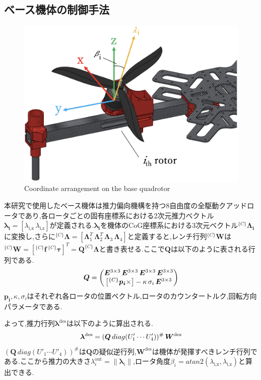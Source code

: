 \documentclass{jarticle}
\begin{document}
\subsection{ベース機体の制御手法}
\vspace{-4mm}
\begin{figure}[H]
  \centering
  \includegraphics[width=0.6\columnwidth]{figs/coordinate.eps}
  \caption{Coordinate arrangement on the base quadrotor}
  \label{fig:coordinate}
  \vspace{-2mm}
\end{figure}
本研究で使用したベース機体は推力偏向機構を持つ8自由度の全駆動クアッドロータであり,各ロータごとの固有座標系における2次元推力ベクトル$\bm{\lambda_i} = [\lambda_\text{i,x} \, \lambda_\text{i,z}]$が定義される\cite{j-sugihara}.$\bm{\lambda_i}$を機体のCoG座標系における3次元ベクトル$^{\{C\}}\bm{\Lambda_i}$に変換し,さらに$^{\{C\}}\bm{\Lambda} = [\bm{\Lambda}_1^T \, \bm{\Lambda}_2^T \, \bm{\Lambda}_3 \, \bm{\Lambda}_4]$と定義すると,レンチ行列$^{\{C\}}\bm{W}$は$^{\{C\}}\bm{W} = [^{\{C\}}\bm{f} \, ^{\{C\}}\bm{\tau}]^T = \bm{Q} ^{\{C\}}\bm{\Lambda}$と書き表せる.ここで$\bm{Q}$は以下のように表される行列である.
\vspace{-2mm}
\begin{equation}
  \bm{Q} =
  \begin{pmatrix}
    \bm{E}^{3 \times 3} \, \bm{E}^{3 \times 3} \, \bm{E}^{3 \times 3} \, \bm{E}^{3 \times 3} \\
    \left[ ^{\{C\}}\bm{p_i} \times \right] - \kappa \, \sigma_i \, \bm{E}^{3 \times 3}
  \end{pmatrix}
  \vspace{-2mm}
\end{equation}
$\bm{p_i},\kappa,\sigma_i$はそれぞれ各ロータの位置ベクトル,ロータのカウンタートルク,回転方向パラメータである.

よって,推力行列$\bm{\lambda}^\text{des}$は以下のように算出される.
\vspace{-2mm}
\begin{equation}
  \bm{\lambda}^\text{des} = (\bm{Q} \, diag(U'_1 \cdots U'_4))^\# \, \bm{W}^\text{des}
  \vspace{-2mm}
\end{equation}
$(\bm{Q} \, diag(U'_1 \cdots U'_4))^\#$は$\bm{Q}$の疑似逆行列,$\bm{W}^\text{des}$は機体が発揮すべきレンチ行列である.ここから推力の大きさ$\lambda_i^\text{out} = \| \bm{\lambda}_i \|$,ロータ角度$\beta_i = atan2(\lambda_\text{i,x}, \lambda_\text{i,z})$と算出できる.
\end{document}
